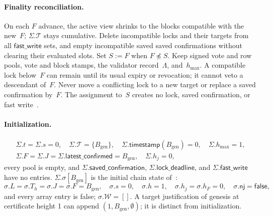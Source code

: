 \documentclass{article}
\theoremstyle{plain}
\theoremstyle{definition}
\theoremstyle{remark}
\newcommand{\genesis}{B_{\mathrm{gen}}}
\newcommand{\nj}{\mathsf{nj}}
\newcommand{\T}{\mathcal T}
\newcommand{\hmax}{h_{\max}}
\newcommand{\latestConfirmed}{\mathsf{latest\_confirmed}}
\newcommand{\timestamp}{\mathsf{timestamp}}
\newcommand{\savedConfirmation}{\mathsf{saved\_confirmation}}
\newcommand{\lockDeadline}{\mathsf{lock\_deadline}}
\newcommand{\fastWrite}{\mathsf{fast\_write}}
\newcommand{\DC}[1]{\cite[\S#1]{DC}}
\begin{document}
\paragraph{Finality reconciliation.}  On each $F$ advance, the active
view shrinks to the blocks compatible with the new~$F$; $\Sigma.\T$
stays cumulative.  Delete incompatible locks and
their targets from all $\fastWrite$ sets, and empty incompatible saved
saved confirmations without clearing their evaluated slots.  Set $S:=F$
when $F\not\preceq S$.  Keep signed vote and row pools, vote and block
stamps, the validator record~$\Lambda$, and~$\hmax$.
A compatible lock below~$F$ can remain until its usual expiry or
revocation; it cannot veto a descendant of~$F$.  Never move a conflicting
lock to a new target or replace a saved confirmation by~$F$.  The assignment
to~$S$ creates no lock, saved confirmation, or fast write~\cite[\S2]{FB}.

\paragraph{Initialization.}
\[
 \begin{gathered}
 \Sigma.t=\Sigma.s=0,\quad \Sigma.\T=\{\genesis\},\quad
 \Sigma.\timestamp(\genesis)=0,\quad \Sigma.\hmax=1,\\
 \Sigma.F=\Sigma.J=\Sigma.\latestConfirmed=\genesis,
 \quad \Sigma.h_j=0,
 \end{gathered}
\]
every pool is empty, and $\Sigma.\savedConfirmation$, $\Sigma.\lockDeadline$, and
$\Sigma.\fastWrite$ have no entries.  $\Sigma.\sigma[\genesis]$ is the
initial chain state of~\DC{4}:
\[
 \sigma.L=\sigma.T_h=\sigma.J=\sigma.F=\genesis,\quad
 \sigma.s=0,\quad \sigma.h=1,\quad \sigma.h_j=\sigma.h_F=0,\quad
 \sigma.\nj=\mathsf{false},
\]
and every array entry is false; $\sigma.\mathcal{W}=[]$.
A target justification of genesis at certificate height 1 can append
$(1,\genesis,\emptyset)$; it is distinct from initialization.
\end{document}
